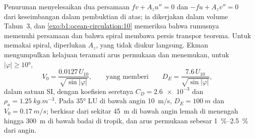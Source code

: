 Penurunan menyelesaikan dua persamaan $f v + A_z u'' = 0$ dan $-f u + A_z v'' =
0$ dari keseimbangan dalam pembuktian di atas; ia dikerjakan dalam volume Tahun~3, dan
\cref{exo:b1:ocean-circulation:10} memeriksa bahwa rumusnya memenuhi persamaan dan bahwa
spiral membawa persis transpor teorema. Untuk memakai spiral, diperlukan $A_z$, yang tidak
diukur langsung. Ekman mengumpulkan kelajuan teramati arus permukaan dan menemukan, untuk $|\varphi| \geq \ang{10}$,
\[
  V_0 = \frac{0.0127\,U_{10}}{\sqrt{\sin|\varphi|}},
  \qquad\text{yang memberi}\qquad
  D_E = \frac{7.6\,U_{10}}{\sqrt{\sin|\varphi|}},
\]
dalam satuan SI, dengan koefisien seretnya $C_D = \num{2.6e-3}$ dan $\rho_a =
\qty{1.25}{kg.m^{-3}}$. Pada \ang{35} LU di bawah angin \qty{10}{m/s}, $D_E =
\qty{100}{m}$ dan $V_0 = \qty{0.17}{m/s}$;  berkisar dari sekitar
\qty{45}{m} di bawah angin lemah di  menengah hingga \qty{300}{m} di bawah badai di tropik, dan arus permukaan sebesar
\qtyrange{1}{2.5}{\percent} dari angin.


